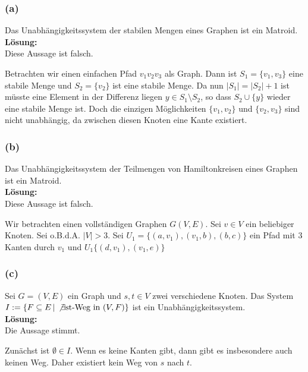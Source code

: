 \documentclass[11pt,a4paper,ngerman]{article}
\begin{document}
\subsubsection*{(a)}

Das Unabhängigkeitssystem der stabilen Mengen eines Graphen ist ein Matroid.\\

\textbf{Lösung:}\\

Diese Aussage ist falsch.

Betrachten wir einen einfachen Pfad $v_1v_2v_3$ als Graph. Dann ist $S_1 = \{v_1, v_3 \}$ eine stabile Menge und $S_2 = \{v_2\}$ ist eine stabile
Menge. Da nun $|S_1| = |S_2| + 1$ ist müsste eine Element in der Differenz liegen $y \in S_1 \setminus S_2$, so dass $S_2 \cup \{y\}$ wieder eine
stabile Menge ist. Doch die einzigen Möglichkeiten $\{v_1, v_2\}$ und $\{v_2, v_3\}$ sind nicht unabhängig, da zwischen diesen Knoten eine Kante existiert.

\subsubsection*{(b)}

Das Unabhängigkeitssystem der Teilmengen von Hamiltonkreisen eines Graphen ist ein Matroid.\\

\textbf{Lösung:}\\

Diese Aussage ist falsch.

Wir betrachten einen vollständigen Graphen $G(V,E)$. Sei $v \in V$ ein beliebiger Knoten. Sei o.B.d.A. $|V| > 3$.
Sei $U_1 = \{ (a,v_1), (v_1, b), (b, c) \}$ ein Pfad mit 3 Kanten durch $v_1$ und $U_1 \{ (d, v_1), (v_1, e) \}$

\subsubsection*{(c)}

Sei $G=(V,E)$ ein Graph und $s,t \in V$ zwei verschiedene Knoten. Das System $I := \{ F \subseteq E \, | \, \not \exists \text{st-Weg in } (V,F) \}$
ist ein Unabhängigkeitssystem.\\

\textbf{Lösung:}\\

Die Aussage stimmt.

Zunächst ist $\emptyset \in I$. Wenn es keine Kanten gibt, dann gibt es insbesondere auch keinen Weg. Daher existiert kein Weg von $s$ nach $t$.
\end{document}
